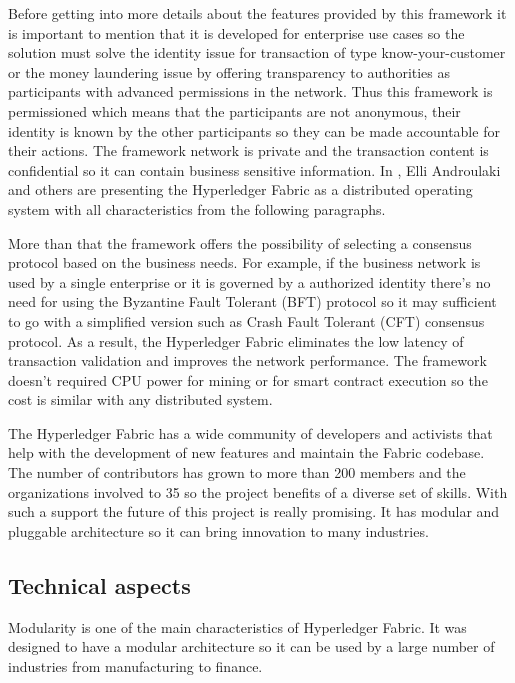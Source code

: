 Before getting into more details about the features provided by this framework it is important to mention that it is developed for enterprise use cases so the solution must solve the identity issue for transaction of type know-your-customer or the money laundering issue by offering transparency to authorities as participants with advanced permissions in the network. Thus this framework is permissioned which means that the participants are not anonymous, their identity is known by the other participants so they can be made accountable for their actions. The framework network is private and the transaction content is confidential so it can contain business sensitive information. In \cite{fabric-article}, Elli Androulaki and others are presenting the Hyperledger Fabric as a distributed operating system with all characteristics from the following paragraphs.

More than that the framework offers the  possibility of selecting a consensus protocol based on the business needs. For example, if the business network is used by a single enterprise or it is governed by a authorized identity there's no need for using the Byzantine Fault Tolerant (BFT) protocol so it may sufficient to go with a simplified version such as Crash Fault Tolerant (CFT) consensus protocol. As a result, the Hyperledger Fabric eliminates the low latency of transaction validation and  improves the network performance. The framework doesn't required CPU power for mining or for smart contract execution so the cost is similar with any distributed system.

The Hyperledger Fabric has a wide community of developers and activists that help with the development of new features and maintain the Fabric codebase. The number of contributors has grown to more than 200 members and the organizations involved to 35 so the project benefits of a diverse set of skills. With such a support the future of this project is really promising. It has modular and pluggable architecture so it can bring innovation to many industries.

\subsection{Technical aspects}
\label{sub-sec:chapter1-subsection2}

Modularity is one of the main characteristics of Hyperledger Fabric. It was
designed to have a modular architecture so it can be used by a large number of industries from manufacturing to finance. 

